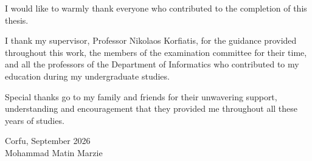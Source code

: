 
I would like to warmly thank everyone who contributed to the completion of this thesis.

I thank my supervisor, Professor Nikolaos Korfiatis, for the guidance provided throughout this work, the members of the examination committee for their time, and all the professors of the Department of Informatics who contributed to my education during my undergraduate studies.

Special thanks go to my family and friends for their unwavering support, understanding and encouragement that they provided me throughout all these years of studies.

\bigskip
\bigskip

Corfu, September 2026 \\
Mohammad Matin Marzie